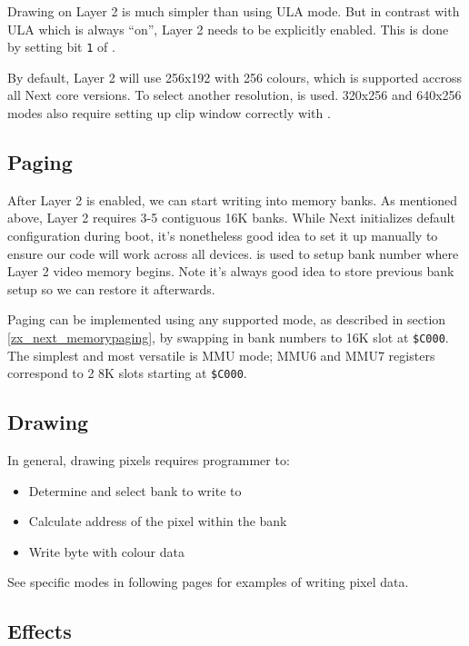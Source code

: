 \documentclass[12pt,twoside,openright,a4paper]{book}
\begin{document}
Drawing on Layer 2 is much simpler than using ULA mode. But in contrast with ULA which is always ``on'', Layer 2 needs to be explicitly enabled. This is done by setting bit {\tt 1} of .

By default, Layer 2 will use 256x192 with 256 colours, which is supported accross all Next core versions. To select another resolution,  is used. 320x256 and 640x256 modes also require setting up clip window correctly with .


\subsection{Paging}

After Layer 2 is enabled, we can start writing into memory banks. As mentioned above, Layer 2 requires 3-5 contiguous 16K banks. While Next initializes default configuration during boot, it's nonetheless good idea to set it up manually to ensure our code will work across all devices.  is used to setup bank number where Layer 2 video memory begins. Note it's always good idea to store previous bank setup so we can restore it afterwards.

Paging can be implemented using any supported mode, as described in section \ref{zx_next_memorypaging}, by swapping in bank numbers to 16K slot at {\tt \$C000}. The simplest and most versatile is MMU mode; MMU6 and MMU7 registers correspond to 2 8K slots starting at {\tt \$C000}.

\subsection{Drawing}

In general, drawing pixels requires programmer to:

\begin{itemize}[topsep=1pt,itemsep=1pt]
	\item Determine and select bank to write to
	\item Calculate address of the pixel within the bank
	\item Write byte with colour data
\end{itemize}

See specific modes in following pages for examples of writing pixel data.


\subsection{Effects}
\end{document}
